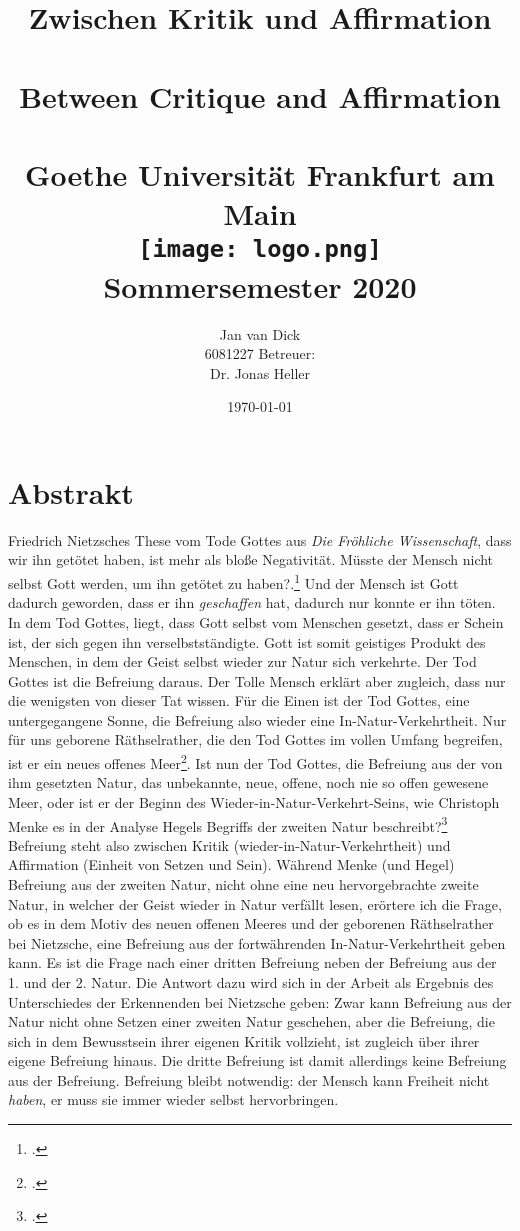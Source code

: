 \documentclass[12pt, a4paper, openany]{report}
\title{
    {\textbf{Zwischen Kritik und Affirmation}}\\ 
    {\large \color{darkgray}{Zweite Natur und Befreiung bei Hegel und Nietzsche}}\\
    {\bigskip}
    {\textbf{Between Critique and Affirmation}}\\
    {\large \color{darkgray}{Second Natur and Liberation in the Philosophies of Hegel and Nietzsche}}\\
    {\bigskip}
    {\large Goethe Universität Frankfurt am Main}\\
    {\bigskip}    
    {\bigskip}
    {\bigskip}    
    {\texttt{[image: logo.png]}}\\
    {\bigskip}    
    {Sommersemester 2020}\\
}
\author{
    {Jan van Dick}\\
    {6081227}
    {Betreuer:}\\
    {Dr. Jonas Heller}
}
\date{\today}
\begin{document}
\maketitle
\frontmatter

\chapter*{Abstrakt}
Friedrich Nietzsches These vom Tode Gottes aus \textit{Die Fröhliche Wissenschaft}, dass \glqq wir\grqq{} ihn getötet haben, ist mehr als bloße Negativität. 
Müsste der Mensch nicht selbst Gott werden, um ihn getötet zu haben?.\footcite[Vgl.][481]{nietzsche_morgenrote_1999} 
Und der Mensch ist Gott dadurch geworden, dass er ihn \textit{geschaffen} hat, dadurch nur konnte er ihn töten. 
In dem Tod Gottes, liegt, dass Gott selbst vom Menschen gesetzt, dass er Schein ist, der sich gegen ihn verselbstständigte.
Gott ist somit geistiges Produkt des Menschen, in dem der Geist selbst wieder zur Natur sich verkehrte.
Der Tod Gottes ist die Befreiung daraus.
Der \glqq Tolle Mensch\grqq{} erklärt aber zugleich, dass nur die wenigsten von dieser Tat wissen. 
Für die Einen ist der Tod Gottes, eine untergegangene Sonne, die Befreiung also wieder eine In-Natur-Verkehrtheit.
Nur für uns \glqq geborene Räthselrather\grqq, die den Tod Gottes im vollen Umfang begreifen, ist er ein \glqq neues offenes Meer\grqq\footcite[][573]{nietzsche_morgenrote_1999}.
Ist nun der Tod Gottes, die Befreiung aus der von ihm gesetzten Natur, das unbekannte, neue, offene, noch nie so offen gewesene Meer, oder ist er der Beginn des Wieder-in-Natur-Verkehrt-Seins, wie Christoph Menke es in der Analyse Hegels Begriffs der zweiten Natur beschreibt?\footcite[Vgl.][144]{menke_autonomie_2018}\\
Befreiung steht also zwischen Kritik (wieder-in-Natur-Verkehrtheit) und Affirmation (Einheit von Setzen und Sein).
Während Menke (und Hegel) Befreiung aus der zweiten Natur, nicht ohne eine neu hervorgebrachte zweite Natur, in welcher der Geist wieder in Natur verfällt lesen, erörtere ich die Frage, ob es in dem Motiv des \glqq neuen offenen Meeres\grqq{} und der \glqq geborenen Räthselrather\grqq{} bei Nietzsche, eine Befreiung aus der fortwährenden In-Natur-Verkehrtheit geben kann.
Es ist die Frage nach einer dritten Befreiung neben der Befreiung aus der 1. und der 2. Natur. 
Die Antwort dazu wird sich in der Arbeit als Ergebnis des Unterschiedes der \glqq Erkennenden\grqq{} bei Nietzsche geben:
Zwar kann Befreiung aus der Natur nicht ohne Setzen einer zweiten Natur geschehen, aber die Befreiung, die sich in dem Bewusstsein ihrer eigenen Kritik vollzieht, ist zugleich über ihrer eigene Befreiung hinaus.
Die dritte Befreiung ist damit allerdings keine Befreiung aus der Befreiung.
Befreiung bleibt notwendig: der Mensch kann Freiheit nicht \textit{haben}, er muss sie immer wieder selbst hervorbringen.
\end{document}
